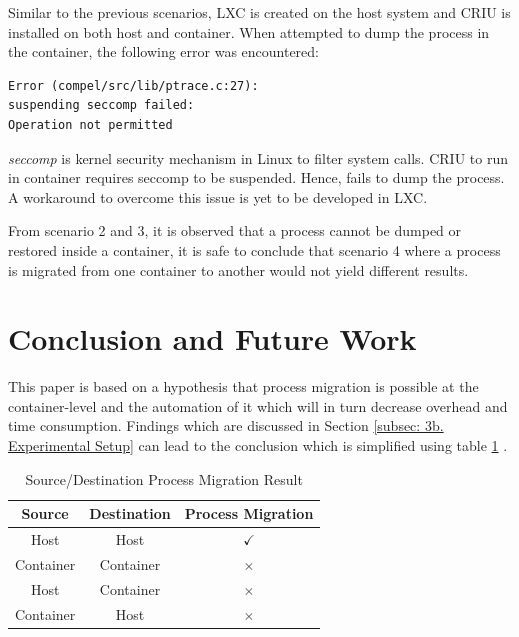 \documentclass[conference]{IEEEtran}
\begin{document}
\noindent Similar to the previous scenarios, LXC is created on the host system and CRIU is installed on both host and container. When attempted to dump the process in the container, the following error was encountered:

\begin{verbatim}
Error (compel/src/lib/ptrace.c:27): 
suspending seccomp failed: 
Operation not permitted
\end{verbatim}

\noindent \emph{seccomp} is kernel security mechanism in Linux to filter system calls. CRIU to run in container requires seccomp to be suspended. Hence, fails to dump the process. A workaround to overcome this issue is yet to be developed in LXC. 

From scenario 2 and 3, it is observed that a process cannot be dumped or restored inside a container, it is safe to conclude that scenario 4 where a process is migrated from one container to another would not yield different results. 

\section{Conclusion and Future Work}
\label{sec: 4.Conclusion and Future Work}

This paper is based on a hypothesis that process migration is possible at the container-level and the automation of it which will in turn decrease overhead and time consumption. Findings which are discussed in Section \ref{subsec: 3b. Experimental Setup} can lead to the conclusion which is simplified using table \ref{table 5} . 


\begin{table}[htbp]
\caption{Source/Destination Process Migration Result}
\begin{center}
\begin{tabular}{|c|c|c|}
\hline
\textbf{Source}&\textbf{Destination}&\textbf{Process Migration} \\
\cline{1-2} 
\hline
Host & Host & $\checkmark$ \\
\hline
Container & Container & $\times$ \\
\hline
Host & Container & $\times$ \\
\hline
Container & Host & $\times$ \\
\hline
\end{tabular}
\label{table 5}
\end{center}
\end{table}
\end{document}
